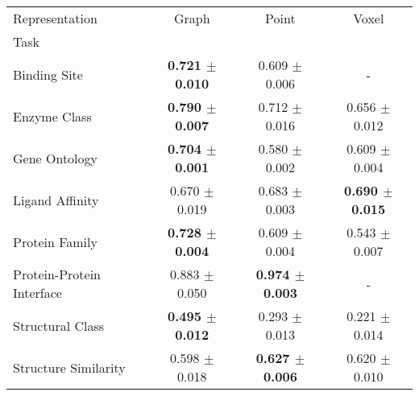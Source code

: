 \begin{tabular}{lccc}
\toprule
Representation & Graph & Point & Voxel \\
Task &  &  &  \\
\midrule
Binding Site & \textbf{0.721 $\pm$ 0.010} & 0.609 $\pm$ 0.006 & - \\
Enzyme Class & \textbf{0.790 $\pm$ 0.007} & 0.712 $\pm$ 0.016 & 0.656 $\pm$ 0.012 \\
Gene Ontology & \textbf{0.704 $\pm$ 0.001} & 0.580 $\pm$ 0.002 & 0.609 $\pm$ 0.004 \\
Ligand Affinity & 0.670 $\pm$ 0.019 & 0.683 $\pm$ 0.003 & \textbf{0.690 $\pm$ 0.015} \\
Protein Family & \textbf{0.728 $\pm$ 0.004} & 0.609 $\pm$ 0.004 & 0.543 $\pm$ 0.007 \\
Protein-Protein Interface & 0.883 $\pm$ 0.050 & \textbf{0.974 $\pm$ 0.003} & - \\
Structural Class & \textbf{0.495 $\pm$ 0.012} & 0.293 $\pm$ 0.013 & 0.221 $\pm$ 0.014 \\
Structure Similarity & 0.598 $\pm$ 0.018 & \textbf{0.627 $\pm$ 0.006} & 0.620 $\pm$ 0.010 \\
\bottomrule
\end{tabular}
